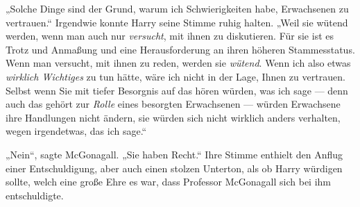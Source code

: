 „Solche Dinge sind der Grund, warum ich Schwierigkeiten habe, Erwachsenen zu vertrauen.“ Irgendwie konnte Harry seine Stimme ruhig halten.
„Weil sie wütend werden, wenn man auch nur \emph{versucht}, mit ihnen zu diskutieren. Für sie ist es Trotz und Anmaßung und eine Herausforderung an ihren höheren Stammesstatus. Wenn man versucht, mit ihnen zu reden, werden sie \emph{wütend}. Wenn ich also etwas \emph{wirklich Wichtiges} zu tun hätte, wäre ich nicht in der Lage, Ihnen zu vertrauen. Selbst wenn Sie mit tiefer Besorgnis auf das hören würden, was ich sage — denn auch das gehört zur \emph{Rolle} eines besorgten Erwachsenen — würden Erwachsene ihre Handlungen nicht ändern, sie würden sich nicht wirklich anders verhalten, wegen irgendetwas, das ich sage.“

„Nein“, sagte McGonagall.
„Sie haben Recht.“ Ihre Stimme enthielt den Anflug einer Entschuldigung, aber auch einen stolzen Unterton, als ob Harry würdigen sollte, welch eine große Ehre es war, dass Professor McGonagall sich bei ihm entschuldigte.


